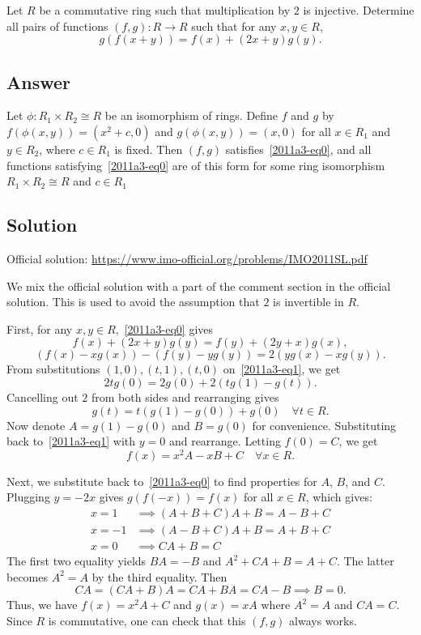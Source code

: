 Let $R$ be a commutative ring such that multiplication by $2$ is injective.
Determine all pairs of functions $(f, g) : R \to R$ such that for any $x, y \in R$,
\[ g(f(x + y)) = f(x) + (2x + y) g(y). \tag{*}\label{2011a3-eq0} \]



\subsection*{Answer}

Let $\phi : R_1 \times R_2 \cong R$ be an isomorphism of rings.
Define $f$ and $g$ by $f(\phi(x, y)) = (x^2 + c, 0)$ and $g(\phi(x, y)) = (x, 0)$ for all $x \in R_1$ and $y \in R_2$, where $c \in R_1$ is fixed.
Then $(f, g)$ satisfies~\eqref{2011a3-eq0}, and all functions satisfying~\eqref{2011a3-eq0} are of this form for some ring isomorphism $R_1 \times R_2 \cong R$ and $c \in R_1$



\subsection*{Solution}

Official solution: \url{https://www.imo-official.org/problems/IMO2011SL.pdf}

We mix the official solution with a part of the comment section in the official solution.
This is used to avoid the assumption that $2$ is invertible in $R$.

First, for any $x, y \in R$,~\eqref{2011a3-eq0} gives
\[ f(x) + (2x + y) g(y) = f(y) + (2y + x) g(x), \]
\[ (f(x) - x g(x)) - (f(y) - y g(y)) = 2 (y g(x) - x g(y)). \tag{1}\label{2011a3-eq1} \]
From substitutions $(1, 0), (t, 1), (t, 0)$ on~\eqref{2011a3-eq1}, we get
\[ 2 t g(0) = 2 g(0) + 2 (t g(1) - g(t)). \]
Cancelling out $2$ from both sides and rearranging gives
\[ g(t) = t (g(1) - g(0)) + g(0) \quad \forall t \in R. \tag{2}\label{2011a3-eq2} \]
Now denote $A = g(1) - g(0)$ and $B = g(0)$ for convenience.
Substituting back to~\eqref{2011a3-eq1} with $y = 0$ and rearrange.
Letting $f(0) = C$, we get
\[ f(x) = x^2 A - xB + C \quad \forall x \in R. \tag{3}\label{2011a3-eq3} \]

Next, we substitute back to~\eqref{2011a3-eq0} to find properties for $A$, $B$, and $C$.
Plugging $y = -2x$ gives $g(f(-x)) = f(x)$ for all $x \in R$, which gives:
\begin{align*}
    x = 1 &\implies (A + B + C)A + B = A - B + C \\
    x = -1 &\implies (A - B + C)A + B = A + B + C \\
    x = 0 &\implies CA + B = C
\end{align*}
The first two equality yields $BA = -B$ and $A^2 + CA + B = A + C$.
The latter becomes $A^2 = A$ by the third equality.
Then \[ CA = (CA + B)A = CA + BA = CA - B \implies B = 0. \]
Thus, we have $f(x) = x^2 A + C$ and $g(x) = xA$ where $A^2 = A$ and $CA = C$.
Since $R$ is commutative, one can check that this $(f, g)$ always works.


